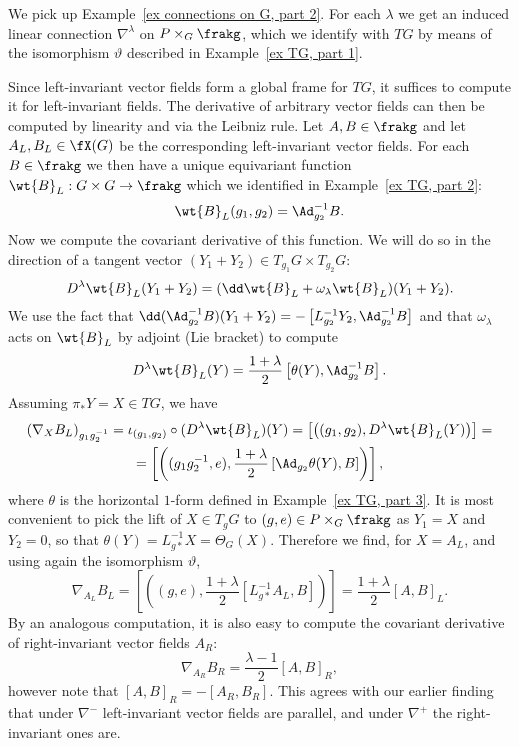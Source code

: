 \begin{example}\label{ex connections on G, part 3}
    We pick up Example~\ref{ex connections on G, part 2}. For each $\lambda$ we get an induced linear connection $\nabla^\lambda$ on $P\times_G \frakg$, which we identify with $TG$ by means of the isomorphism $\vartheta$ described in Example~\ref{ex TG, part 1}. 

    Since left-invariant vector fields form a global frame for $TG$, it suffices to compute it for left-invariant fields. The derivative of arbitrary vector fields can then be computed by linearity and via the Leibniz rule. Let $A,B\in\frakg$ and let $A_L,B_L\in\fX(G)$ be the corresponding left-invariant vector fields. 
    For each $B\in\frakg$ we then have a unique equivariant function $\wt{B}_L:G\times G\to \frakg$ which we identified in Example~\ref{ex TG, part 2}:
    \[
        \wt{B}_L(g_1,g_2)=\Ad_{g_2}^{-1}B.
    \]
    Now we compute the covariant derivative of this function. We will do so in the direction of a tangent vector $(Y_1+Y_2)\in T_{g_1}G\times T_{g_2}G$:
    \[D^\lambda \wt{B}_L(Y_1+Y_2)=(\dd\wt{B}_L+\omega_\lambda \wt{B}_L)(Y_1+Y_2).\]
    We use the fact that $\dd (\Ad_{g_2}^{-1} B)(Y_1+Y_2)=-\left[ L_{g_2}^{-1}Y_2,\Ad_{g_2}^{-1}B\right]$ and that $\omega_\lambda$ acts on $\wt{B}_L$ by adjoint (Lie bracket) to compute
    \[D^\lambda \wt{B}_L(Y)=\frac{1+\lambda}{2}\left[\theta(Y),\Ad_{g_2}^{-1}B\right].\]
    Assuming $\pi_\ast Y=X\in TG$, we have
    \begin{multline}
        \left( \nabla_X B_L \right)_{g_1g_2^{-1}}=\iota_{(g_1,g_2)}\circ (D^\lambda \wt{B}_L)(Y)=\left[\left( (g_1,g_2),D^\lambda \wt{B}_L(Y) \right)\right]=\\=\left[\left( (g_1g_2^{-1},e),\frac{1+\lambda}{2}\left[\Ad_{g_2}\theta(Y),B\right]\right)\right],
    \end{multline}
    where $\theta$ is the horizontal $1$-form defined in Example~\ref{ex TG, part 3}.
    It is most convenient to pick the lift of $X\in T_g G$ to $(g,e)\in P\times_G \frakg$ as $Y_1=X$ and $Y_2=0$, so that $\theta(Y)=L_{g\ast}^{-1}X=\Theta_G(X)$. Therefore we find, for $X=A_L$, and using again the isomorphism $\vartheta$,
    \[\nabla_{A_L}B_L=\left[\left( (g,e),\frac{1+\lambda}{2}[L_{g\ast}^{-1}A_L,B] \right)\right]=\frac{1+\lambda}{2}[A,B]_L.\]
    By an analogous computation, it is also easy to compute the covariant derivative of right-invariant vector fields $A_R$:
    \[\nabla_{A_R}B_R=\frac{\lambda-1}{2}[A,B]_R,\]
    however note that $[A,B]_R=-[A_R,B_R]$. This agrees with our earlier finding that under $\nabla^-$ left-invariant vector fields are parallel, and under $\nabla^+$ the right-invariant ones are.  
    

\end{example}
